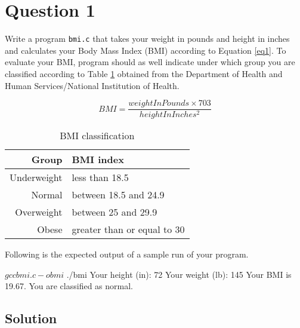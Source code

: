 \documentclass[12pt,letterpaper,twoside]{article}
\begin{document}


\section*{Question 1}

Write a program \texttt{bmi.c} that takes your weight in pounds and height in inches and calculates your Body Mass Index (BMI) according to Equation \ref{eq1}.
To evaluate your BMI, program should as well indicate under which group you are classified according to Table \ref{tab1} obtained from the Department of Health and Human Services/National Institution of Health.

\begin{equation}
BMI = \frac{weightInPounds \times 703}{heightInInches^2}
\label{eq1}
\end{equation}

\begin{table}[H]\centering
\begin{tabular}{|r|l|}
\hline
Group & BMI index \\
\hline
Underweight & less than 18.5 \\
Normal & between 18.5 and 24.9 \\
Overweight & between 25 and 29.9 \\
Obese & greater than or equal to 30 \\
\hline
\end{tabular}
\caption{BMI classification}\label{tab1}
\end{table}

Following is the expected output of a sample run of your program.

\begin{terminal}
$ gcc bmi.c -o bmi
$ ./bmi
Your height (in): 72
Your weight (lb): 145
Your BMI is 19.67.
You are classified as normal.
\end{terminal}

\newpage

\subsection*{Solution}

\lstset{language=c,tabsize=4}


\newpage
\end{document}
